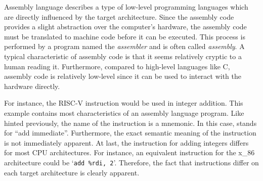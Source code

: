 Assembly language describes a type of low-level programming languages which are directly influenced by the target architecture.
Since the assembly code provides a slight abstraction over the computer's hardware,
the assembly code must be translated to machine code before it can be executed.
This process is performed by a program named the \emph{assembler} and is often called \emph{assembly}.
A typical characteristic of assembly code is that it seems relatively cryptic to a human reading it.
Furthermore, compared to high-level languages like C, assembly code is relatively low-level since it can be used to interact with the hardware directly.

For instance, the RISC-V instruction  would be used in integer addition.
This example contains most characteristics of an assembly language program.
Like hinted previously, the name of the instruction is a mnemonic.
In this case,  stands for \enquote{add immediate}.
Furthermore, the exact semantic meaning of the instruction is not immediately apparent.
At last, the instruction for adding integers differs for most CPU architectures.
For instance, an equivalent instruction for the x\_86 architecture could be `\texttt{add \%rdi, 2}'.
Therefore, the fact that instructions differ on each target architecture is clearly apparent.

